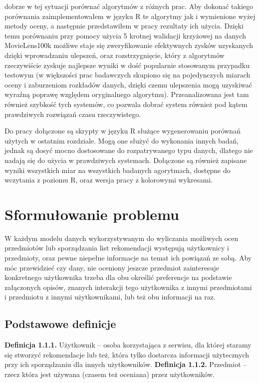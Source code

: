 \documentclass{pracamgr}
\begin{document}
  dobrze w tej sytuacji porównać algorytmów z różnych prac.
  Aby dokonać takiego porównania zaimplementowałem w języku R te algorytmy jak i wymienione wyżej metody oceny,
  a następnie przedstawiłem w pracy rezultaty ich użycia.
  Dzięki temu porównaniu przy pomocy użycia 5 krotnej walidacji krzyżowej na danych
  MovieLens100k \cite{ML} możliwe staje się zweryfikowanie efektywnych zysków uzyskanych dzięki wprowadzaniu ulepszeń,
  oraz rozstrzygnięcie, który z algorytmów rzeczywiście zyskuje najlepsze wyniki w dość popularnie stosowanym przypadku testowym
  (w większości prac badawczych skupiono się na pojedynczych miarach oceny i zaburzeniom rozkładów danych,
  dzięki czemu ulepszenia mogą uzyskiwać wyraźną poprawę względem oryginalnego algorytmu).
  Przeanalizowana jest tam również szybkość tych systemów, co pozwala dobrać system również pod kątem prawdziwych rozwiązań czasu rzeczywistego.\newline
  
  Do pracy dołączone są skrypty w języku R służące wygenerowaniu porównań użytych w ostatnim rozdziale.
  Mogą one służyć do wykonania innych badań, jednak są dosyć mocno dostosowane do rozpatrywanego typu danych, dlatego nie nadają się do
  użycia w prawdziwych systemach.\newline
  Dołączone są również zapisane wyniki wszystkich miar na wszystkich badanych agorytmach, dostępne do wczytania z poziomu R, oraz wersja pracy z kolorowymi wykresami.

  
 \chapter{Sformułowanie problemu}
  W każdym modelu danych wykorzystywanym do wyliczania możliwych ocen przedmiotów lub sporządzania list rekomendacji
  występują użytkownicy i przedmioty, oraz pewne niepełne informacje na temat ich powiązań ze sobą.
  Aby móc przewidzieć czy dany, nie oceniony jeszcze przedmiot zainteresuje konkretnego użytkownika trzeba dla obu określić preferencje na podstawie 
  załączonych opisów, znanych interakcji tego użytkownika z innymi przedmiotami i przedmiotu z innymi użytkownikami, lub też obu informacji na raz.
  
  \section{Podstawowe definicje}
   \textbf{Definicja 1.1.1.} Użytkownik -- osoba korzystająca z serwisu, dla której staramy się stworzyć rekomendacje lub też,
    która tylko dostarcza informacji użytecznych przy ich sporządzaniu dla innych użytkowników.\newline\newline
   \textbf{Definicja 1.1.2.} Przedmiot -- rzecz która jest używana (czasem też oceniana) przez użytkowników.\newline
   
\end{document}
